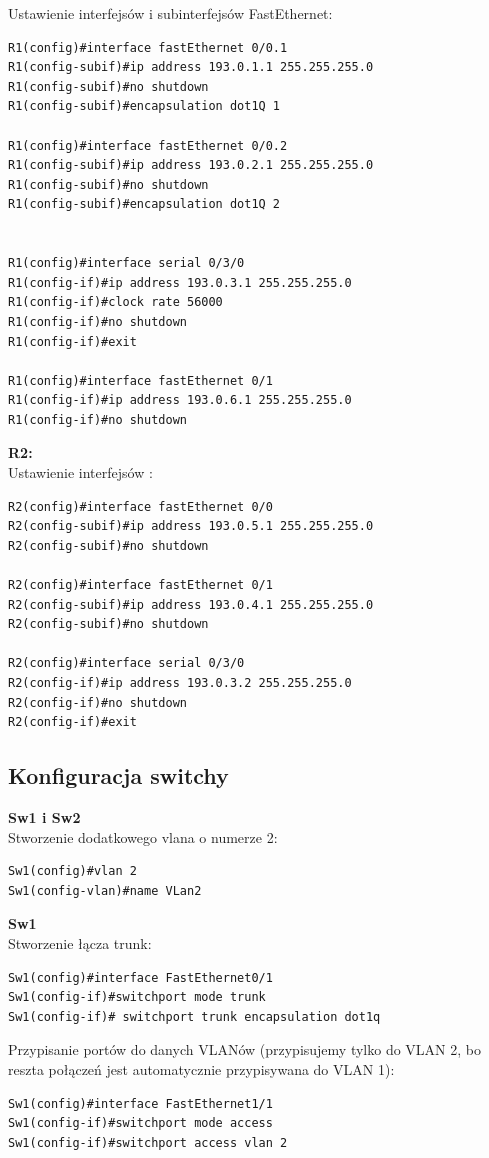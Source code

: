 \documentclass[11pt,a4paper]{article}
\begin{document}
Ustawienie interfejsów i subinterfejsów FastEthernet:
\begin{lstlisting}
R1(config)#interface fastEthernet 0/0.1
R1(config-subif)#ip address 193.0.1.1 255.255.255.0
R1(config-subif)#no shutdown
R1(config-subif)#encapsulation dot1Q 1

R1(config)#interface fastEthernet 0/0.2
R1(config-subif)#ip address 193.0.2.1 255.255.255.0
R1(config-subif)#no shutdown
R1(config-subif)#encapsulation dot1Q 2


R1(config)#interface serial 0/3/0
R1(config-if)#ip address 193.0.3.1 255.255.255.0
R1(config-if)#clock rate 56000
R1(config-if)#no shutdown 
R1(config-if)#exit

R1(config)#interface fastEthernet 0/1
R1(config-if)#ip address 193.0.6.1 255.255.255.0
R1(config-if)#no shutdown
\end{lstlisting}

\noindent
{\bf R2:}\\
Ustawienie interfejsów :
\begin{lstlisting}
R2(config)#interface fastEthernet 0/0
R2(config-subif)#ip address 193.0.5.1 255.255.255.0
R2(config-subif)#no shutdown

R2(config)#interface fastEthernet 0/1
R2(config-subif)#ip address 193.0.4.1 255.255.255.0
R2(config-subif)#no shutdown

R2(config)#interface serial 0/3/0
R2(config-if)#ip address 193.0.3.2 255.255.255.0
R2(config-if)#no shutdown 
R2(config-if)#exit
\end{lstlisting}

\subsection{Konfiguracja switchy}
{\bf Sw1 i Sw2}\\
Stworzenie dodatkowego vlana o numerze 2:
\begin{lstlisting}
Sw1(config)#vlan 2
Sw1(config-vlan)#name VLan2
\end{lstlisting}
\noindent
{\bf Sw1}\\
Stworzenie łącza trunk:
\begin{lstlisting}
Sw1(config)#interface FastEthernet0/1
Sw1(config-if)#switchport mode trunk
Sw1(config-if)# switchport trunk encapsulation dot1q
\end{lstlisting}
Przypisanie portów do danych VLANów (przypisujemy tylko do VLAN 2, bo reszta połączeń jest automatycznie przypisywana do VLAN 1):
\begin{lstlisting}
Sw1(config)#interface FastEthernet1/1
Sw1(config-if)#switchport mode access
Sw1(config-if)#switchport access vlan 2
\end{lstlisting}
\end{document}
